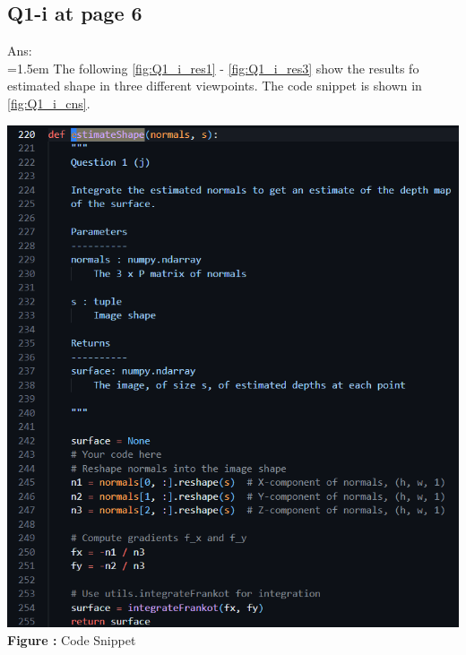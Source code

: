 \documentclass{article}
\begin{document}
	\newpage
	\subsection*{Q1-i at page 6}
	Ans:\\
	\hangindent=1.5em \hspace{1.5em} The following \autoref{fig:Q1_i_res1} - \autoref{fig:Q1_i_res3} show the results fo estimated shape in three different viewpoints. The code snippet is shown in \autoref{fig:Q1_i_cns}.
	\newline
	
	\begin{minipage}{1\linewidth}
	\centering
	\includegraphics[width=1\columnwidth, height=1\linewidth]{./Q1_i_cns.png}
	  \\%
	\textbf{Figure \thefigure:} Code Snippet %
	\label{fig:Q1_i_cns}         %
	\end{minipage}	
	
\end{document}
